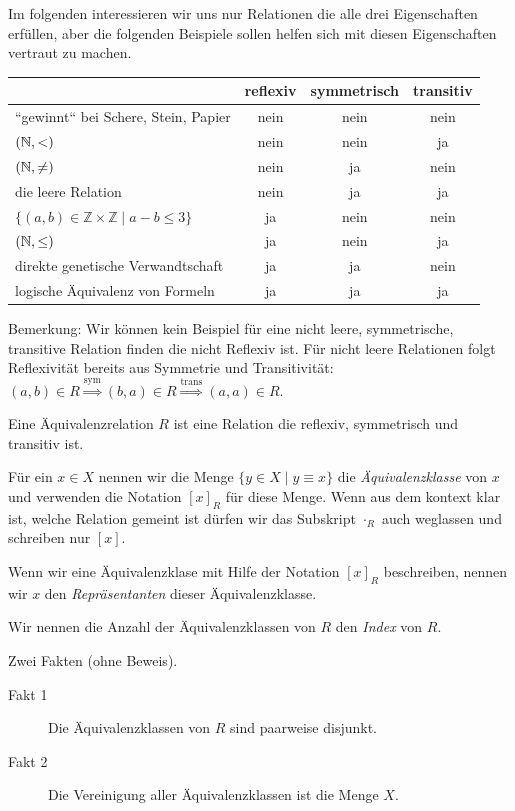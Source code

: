 \begin{Bsp} Im folgenden interessieren wir uns nur Relationen die alle drei Eigenschaften erfüllen, 
aber die folgenden Beispiele sollen helfen sich mit diesen Eigenschaften vertraut zu machen.

\begin{center}
\begin{tabular}{lccc}
& reflexiv & symmetrisch & transitiv\\ \hline
``gewinnt`` bei Schere, Stein, Papier & nein & nein & nein\\
$(\mathbb{N}, <)$ & nein & nein & ja\\
$(\mathbb{N}, \neq)$ & nein & ja & nein\\
die leere Relation & nein & ja & ja\\
$\{(a,b)\in\mathbb{Z}\times\mathbb{Z}\mid a-b\leq 3\}$ & ja & nein & nein\\
$(\mathbb{N}, \leq)$& ja & nein & ja\\
direkte genetische Verwandtschaft & ja & ja & nein\\
logische Äquivalenz von Formeln & ja & ja & ja\\
\end{tabular}
\end{center}
Bemerkung: Wir können kein Beispiel für eine nicht leere, symmetrische, transitive Relation finden die nicht Reflexiv ist.
Für nicht leere Relationen folgt Reflexivität bereits aus Symmetrie und Transitivität: 
$(a,b)\in R\stackrel{\text{sym}}{\Rightarrow} (b,a)\in R\stackrel{\text{trans}}{\Rightarrow} (a,a)\in R$.

\end{Bsp}

\begin{Def}
Eine Äquivalenzrelation $R$ ist eine Relation die reflexiv, symmetrisch und transitiv ist.

Für ein $x\in X$ nennen wir die Menge $\{y\in X \mid y \equiv x\}$ die \emph{Äquivalenzklasse} von $x$
und verwenden die Notation $[x]_R$ für diese Menge.
Wenn aus dem kontext klar ist, welche Relation gemeint ist dürfen wir das Subskript $\cdot_R$ auch weglassen und schreiben nur $[x]$.

Wenn wir eine Äquivalenzklase mit Hilfe der Notation $[x]_R$ beschreiben, nennen wir $x$ den \emph{Repräsentanten} dieser Äquivalenzklasse.

Wir nennen die Anzahl der Äquivalenzklassen von $R$ den \emph{Index} von $R$.
\end{Def}

Zwei Fakten (ohne Beweis).
\begin{description}
 \item[Fakt 1] Die Äquivalenzklassen von $R$ sind paarweise disjunkt.
 \item[Fakt 2] Die Vereinigung aller Äquivalenzklassen ist die Menge $X$.
\end{description}


